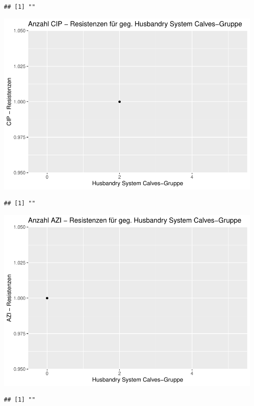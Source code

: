 \documentclass[
]{article}
\begin{document}
\begin{verbatim}
## [1] ""
\end{verbatim}

\includegraphics{NResistenzen_files/figure-latex/unnamed-chunk-7-32.pdf}

\begin{verbatim}
## [1] ""
\end{verbatim}

\includegraphics{NResistenzen_files/figure-latex/unnamed-chunk-7-33.pdf}

\begin{verbatim}
## [1] ""
\end{verbatim}
\end{document}
